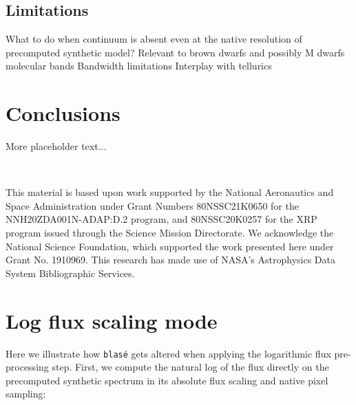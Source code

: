 \documentclass[modern]{aastex631}
\begin{document}
\subsection{Limitations}
\begin{outline}
    \1 What to do when continuum is absent even at the native resolution of precomputed synthetic model?
    \1 Relevant to brown dwarfs and possibly M dwarfs molecular bands
    \1 Bandwidth limitations
    \1 Interplay with tellurics
\end{outline}



\section{Conclusions}
More placeholder text...


\

\begin{acknowledgements}
    This material is based upon work supported by the National Aeronautics and Space Administration under Grant Numbers 80NSSC21K0650 for the NNH20ZDA001N-ADAP:D.2 program, and 80NSSC20K0257 for the XRP program issued through the Science Mission Directorate.  We acknowledge the National Science Foundation, which supported the work presented here under Grant No. 1910969.  This research has made use of NASA's Astrophysics Data System Bibliographic Services.
\end{acknowledgements}

\clearpage








\clearpage

\appendix
\restartappendixnumbering

\section{Log flux scaling mode} \label{appendixLogScale}

Here we illustrate how \texttt{blas\'e} gets altered when applying the logarithmic flux pre-processing step.  First, we compute the natural log of the flux directly on the precomputed synthetic spectrum in its absolute flux scaling and native pixel sampling:
\end{document}
